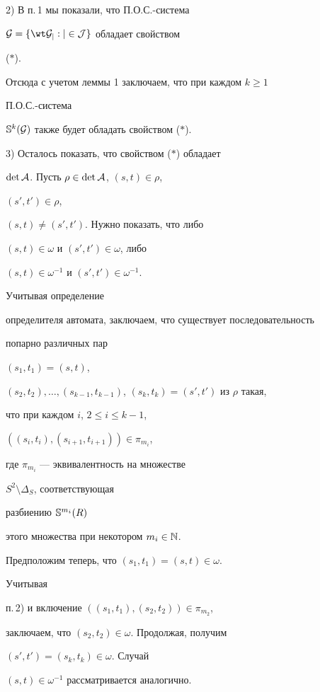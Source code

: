 \begin{pf}
2) В п.\,1 мы показали, что П.О.С.-система


$\cal G=\{\wt G_j:j\in J\}$ обладает свойством


($\ast$).


Отсюда с учетом леммы 1 заключаем, что при каждом $k\ge 1$


П.О.С.-система


$\Bbb S^k(\cal G)$ также будет обладать свойством ($\ast$).





3) Осталось показать, что свойством ($\ast$) обладает


$\det\cal A$. Пусть $\rho\in\det\cal A$, $(s,t)\in\rho$,


$(s',t')\in\rho$,


$(s,t)\ne(s',t')$. Нужно показать, что либо


$(s,t)\in\omega$ и $(s',t')\in\omega$, либо


$(s,t)\in\omega^{-1}$ и $(s',t')\in\omega^{-1}$.


Учитывая определение


определителя автомата, заключаем, что существует последовательность


попарно различных пар


$(s_1,t_1)=(s,t)$,


$(s_2,t_2),\dotsc,(s_{k-1},t_{k-1})$, $(s_k,t_k)=(s',t')$ из $\rho$ такая,


что при каждом $i$, $2\le i\le k-1$,


$((s_i,t_i),(s_{i+1},t_{i+1}))\in\pi_{m_i}$,


где $\pi_{m_i}$ --- эквивалентность на множестве


$S^2\setminus\Delta_S$, соответствующая


разбиению $\Bbb S^{m_i}(R)$


этого множества при некотором $m_i\in\Bbb N$.


Предположим теперь, что $(s_1,t_1)=(s,t)\in\omega$.


Учитывая


п.\,2) и включение $((s_1,t_1),(s_2,t_2))\in\pi_{m_2}$,


заключаем, что $(s_2,t_2)\in\omega$. Продолжая, получим


$(s',t')=(s_k,t_k)\in\omega$. Случай


$(s,t)\in\omega^{-1}$ рассматривается аналогично.


\end{pf}





